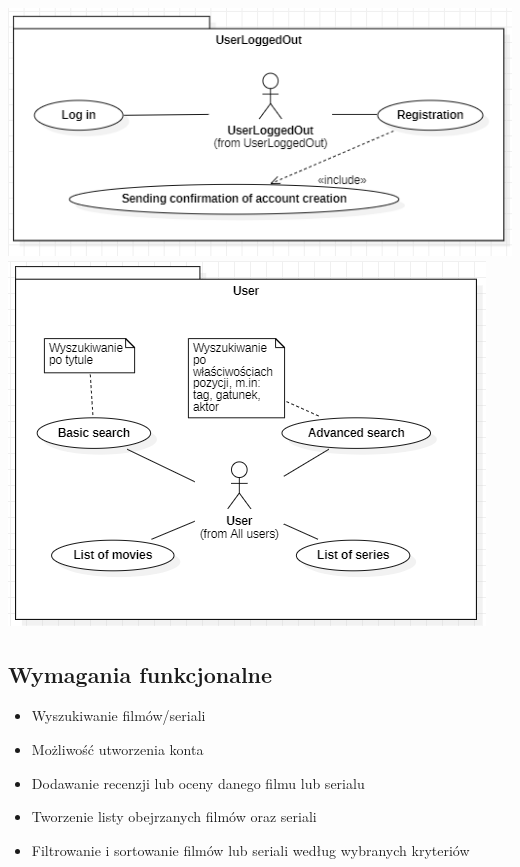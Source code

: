 \documentclass[12pt]{article}
\begin{document}
			\includegraphics[scale=0.9]{UseCase_UserNotLoggedIn.png} \linebreak
			\includegraphics[scale=0.9]{UseCase_User.png} \linebreak
		\subsection{Wymagania funkcjonalne}
			\begin{itemize}
				\item Wyszukiwanie filmów/seriali
				\item Możliwość utworzenia konta
				\item Dodawanie recenzji lub oceny danego filmu lub serialu
				\item Tworzenie listy obejrzanych filmów oraz seriali
				\item Filtrowanie i sortowanie filmów lub seriali według wybranych kryteriów
			\end{itemize}
\end{document}
